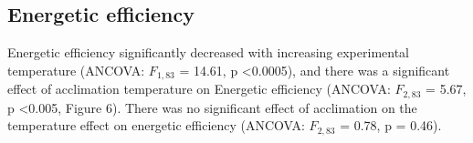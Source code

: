 \documentclass[../../Paper.tex]{subfiles}
\begin{document}
\subsection*{Energetic efficiency}

Energetic efficiency significantly decreased with increasing experimental 
temperature (ANCOVA: $F_{1,83}$ = 14.61, p \textless  0.0005), and there was a 
significant effect of acclimation temperature on Energetic efficiency 
(ANCOVA: $F_{2,83}$ = 5.67, p \textless  0.005, Figure 6). There was no significant effect of
acclimation on the temperature effect on energetic efficiency (ANCOVA: $F_{2,83}$ = 0.78, 
p = 0.46). 
\end{document}
